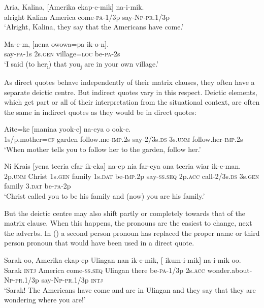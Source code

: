 \ea%
\label{ex:x1585}
\gll Aria,  Kalina,  [Amerika  ekap-e-mik]  na-i-mik. \\
alright  Kalina  America  come-\textsc{pa}-1/3p say-\textsc{Np}-\textsc{pr}.1/3p\\
\glt`Alright, Kalina, they say that the Americans have come.'
\z


\ea%
\label{ex:x1587}
\gll Ma-e-m,  [nena  owowa=pa  ik-o-n].\\
say-\textsc{pa}-1s 2s.\textsc{gen} village=\textsc{loc} be-\textsc{pa}-2s\\
\glt`I said (to her\textsubscript{i}) that you\textsubscript{j} are in your own village.'
\z


As direct quotes behave independently of their matrix clauses, they often have a separate deictic centre. But indirect quotes vary in this respect. Deictic elements, which get part or all of their interpretation from the situational context, are often the same in indirect quotes as they would be in direct quotes: 

\ea%
\label{ex:x1584}
\gll Aite=ke  [manina  yook-e]  na-eya  o ook-e.\\
1s/p.mother=\textsc{cf} garden follow.me-\textsc{imp}.2s say-2/3s.\textsc{ds} 3s.\textsc{unm} follow.her-\textsc{imp}.2s\\
\glt`When mother tells you to follow her to the garden, follow her.'
\z


\ea%
\label{ex:x1280}
\gll Ni  Krais  [yena  teeria  efar  ik-eka]  na-ep nia  far-eya  ona  teeria  wiar  ik-e-man.\\
2p.\textsc{unm} Christ 1s.\textsc{gen} family 1s.\textsc{dat} be-\textsc{imp}.2p say-\textsc{ss}.\textsc{seq} 2p.\textsc{acc} call-2/3s.\textsc{ds} 3s.\textsc{gen} family 3.\textsc{dat} be-\textsc{pa}-2p\\
\glt`Christ called you to be his family and (now) you are his family.'
\z


But the deictic centre may also shift partly or completely towards that of the matrix clause. When this happens, the pronouns are the easiest to change, next the adverbs. In () a second person pronoun has replaced the proper name or third person pronoun that would have been used in a direct quote.

\ea%
\label{ex:x1586}
\gll Sarak  oo,  Amerika  ekap-ep  Ulingan  nan  ik-e-mik, [  ikum-i-mik]  na-i-mik  oo. \\
Sarak \textsc{intj} America come-\textsc{ss}.\textsc{seq} Ulingan  there be-\textsc{pa}-1/3p 2s.\textsc{acc} wonder.about-\textsc{Np}-\textsc{pr}.1/3p say-\textsc{Np}-\textsc{pr}.1/3p \textsc{intj}\\
\glt`Sarak! The Americans have come and are in Ulingan and they say that they are wondering where you are!'
\z


